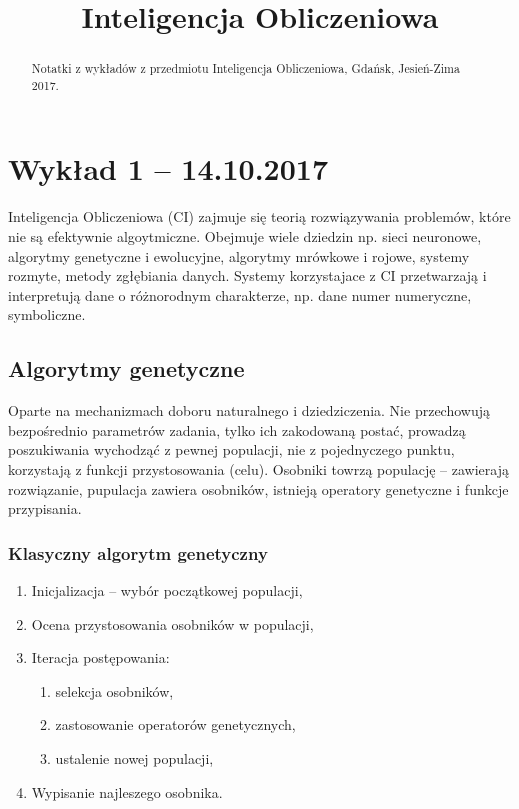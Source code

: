 \documentclass[runningheads,a4paper]{llncs}
\begin{document}
\mainmatter 

\title{Inteligencja Obliczeniowa}
\author{{}}

\tocauthor{{}}
\maketitle

\begin{abstract}
Notatki z wykładów z przedmiotu Inteligencja Obliczeniowa, Gdańsk, Jesień-Zima 2017.
\end{abstract}

\medskip
\begingroup
\let\clearpage\relax
\tableofcontents
\endgroup
\newpage

%
\section{Wykład 1 – 14.10.2017}
Inteligencja Obliczeniowa (CI) zajmuje się teorią rozwiązywania problemów, które nie są efektywnie algoytmiczne. Obejmuje wiele dziedzin np. sieci  neuronowe, algorytmy genetyczne i ewolucyjne, algorytmy mrówkowe i rojowe, systemy rozmyte, metody zgłębiania danych. Systemy korzystajace z CI przetwarzają i interpretują dane o różnorodnym charakterze, np. dane numer numeryczne, symboliczne.

\subsection{Algorytmy genetyczne}
Oparte na mechanizmach doboru naturalnego i dziedziczenia. Nie przechowują bezpośrednio  parametrów zadania, tylko ich zakodowaną postać, prowadzą poszukiwania wychodząć z pewnej populacji, nie z pojednyczego punktu, korzystają z funkcji przystosowania (celu). Osobniki towrzą populację – zawierają rozwiązanie, pupulacja zawiera osobników, istnieją operatory genetyczne i funkcje przypisania.

\subsubsection{Klasyczny algorytm genetyczny}
\begin{enumerate}
\item Inicjalizacja – wybór początkowej populacji,
\item Ocena przystosowania osobników w populacji,
\item Iteracja postępowania: 
\begin{enumerate}
\item selekcja osobników, 
\item zastosowanie operatorów genetycznych, 
\item ustalenie nowej populacji,
\end{enumerate}
\item Wypisanie najleszego osobnika.
\end{enumerate}
\end{document}

